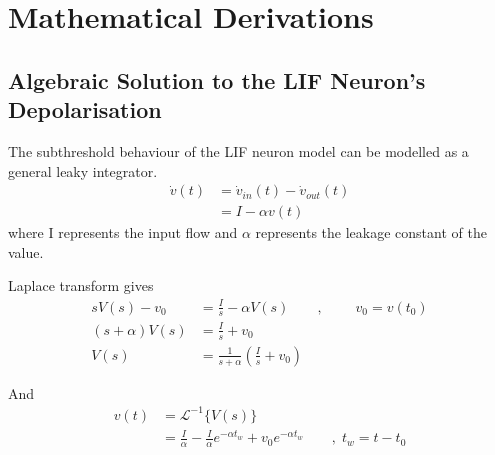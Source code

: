 
\chapter{Mathematical Derivations}

\section{Algebraic Solution to the LIF Neuron's Depolarisation}
\label{appendixAlgebraicSolution}
	The subthreshold behaviour of the LIF neuron model can be modelled as a general leaky integrator.
	\begin{equation}
		\begin{split}
			\dot{v}(t)&= \dot{v}_{in}(t) - \dot{v}_{out}(t) \\
				&= I - \alpha v(t)
		\end{split}
		\label{appendix:eqDifferentialEquation}
	\end{equation}
		where I represents the input flow and $\alpha$ represents the leakage constant of the value.

		Laplace transform gives
	\begin{equation}
		\begin{split}
			sV(s)-v_0 		&= \frac{I}{s} - \alpha V(s) 			\qquad, \; \qquad v_0 = v(t_0) 				\\
			(s+\alpha)V(s) 	&= \frac{I}{s} + v_0 														\\
			V(s) 			&= \frac{1}{s+\alpha}\left( \frac{I}{s} + v_0 \right)
		\end{split}
		\nonumber
	\end{equation}

	And 
	\begin{equation}
		\begin{split}
			v(t)  	&= 		\mathscr{L}^{-1}\bigg\{ V(s) \bigg\}  									\\
			 		&=		\frac{I}{\alpha} - \frac{I}{\alpha} e^{-\alpha t_w} + v_0 e^{-\alpha t_w} \qquad, \; t_w = t - t_0
		\end{split}
		\label{appendix:eqValueEquationUTLEDING}
 	\end{equation}

